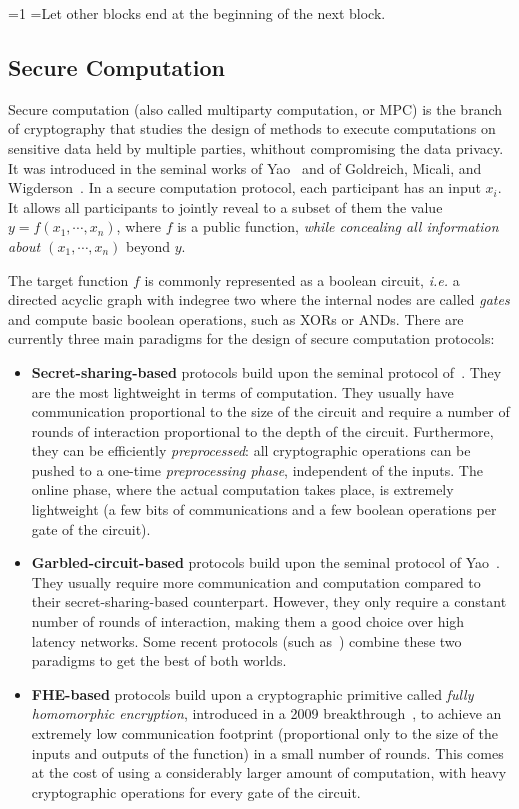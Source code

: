 \documentclass[oneside, a4paper, onecolumn, 11pt]{article}
\newcounter{alphasect}
\def\alphainsection{0}
\newenvironment{alphasection}{%
  \ifnum\alphainsection=1%
    \errhelp={Let other blocks end at the beginning of the next block.}
    \errmessage{Nested Alpha section not allowed}
  \fi%
  \setcounter{alphasect}{0}
  \def\alphainsection{1}
}{%
  \setcounter{alphasect}{0}
  \def\alphainsection{0}
}%
\begin{document}
\begin{alphasection}
\subsection{Secure Computation}
\label{subsec:seccomp}
Secure computation (also called multiparty computation, or MPC) is the branch of cryptography that studies the design of methods to execute computations on sensitive data held by multiple parties, whithout compromising the data privacy. It was introduced in the seminal works of Yao~\cite{FOCS:Yao82b} and of Goldreich, Micali, and Wigderson~\cite{C:GolMicWig86}. In a secure computation protocol, each participant has an input $x_i$. It allows all participants to jointly reveal to a subset of them the value $y = f(x_1, \cdots, x_n)$, where $f$ is a public function, \emph{while concealing all information about $(x_1, \cdots, x_n)$} beyond $y$.

The target function $f$ is commonly represented as a boolean circuit, \emph{i.e.} a directed acyclic graph with indegree two where the internal nodes are called \emph{gates} and compute basic boolean operations, such as XORs or ANDs. There are currently three main paradigms for the design of secure computation protocols:
\begin{itemize}
    \item \textbf{Secret-sharing-based} protocols build upon the seminal protocol of~\cite{C:GolMicWig86}. They are the most lightweight in terms of computation. They usually have communication proportional to the size of the circuit and require a number of rounds of interaction proportional to the depth of the circuit. Furthermore, they can be efficiently \emph{preprocessed}: all cryptographic operations can be pushed to a one-time \emph{preprocessing phase}, independent of the inputs. The online phase, where the actual computation takes place, is extremely lightweight (a few bits of communications and a few boolean operations per gate of the circuit).
    \item \textbf{Garbled-circuit-based} protocols build upon the seminal protocol of Yao~\cite{FOCS:Yao82b}. They usually require more communication and computation compared to their secret-sharing-based counterpart. However, they only require a constant number of rounds of interaction, making them a good choice over high latency networks. Some recent protocols (such as~\cite{CCS:WanRanKat17a}) combine these two paradigms to get the best of both worlds.
    \item \textbf{FHE-based} protocols build upon a cryptographic primitive called \emph{fully homomorphic encryption}, introduced in a 2009 breakthrough~\cite{STOC:Gentry09}, to achieve an extremely low communication footprint (proportional only to the size of the inputs and outputs of the function) in a small number of rounds. This comes at the cost of using a considerably larger amount of computation, with heavy cryptographic operations for every gate of the circuit. 
\end{itemize}


\end{alphasection}
\end{document}
